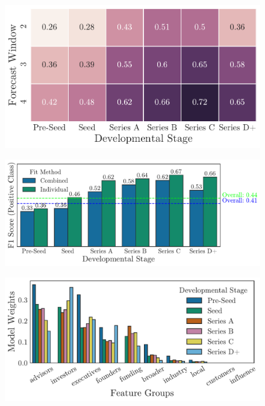 \documentclass[../thesis/thesis.tex]{subfiles}
\begin{document}
\begin{figure}[!htb]
    \centering
    \includegraphics[width=\textwidth]{../figures/evaluation/predictive_heatmap}
    \caption[F1 Scores by developmental stage and forecast window]{}
    \label{fig:evaluation:f1_predictive_heatmap}
\end{figure}

\begin{figure}[!htb]
    \centering
    \includegraphics[width=\textwidth]{../figures/evaluation/f1_individual_overall}
    \caption[F1 Scores by moodel fit method]{}
    \label{fig:evaluation:f1_individual_overall}
\end{figure}

\begin{figure}[!htb]
    \centering
    \includegraphics[width=\textwidth]{../figures/evaluation/feature_groups_stage}
    \caption[Grouped feature weights by developmental stage]{}
    \label{fig:evaluation:feature_groups_stage}
\end{figure}
\end{document}
